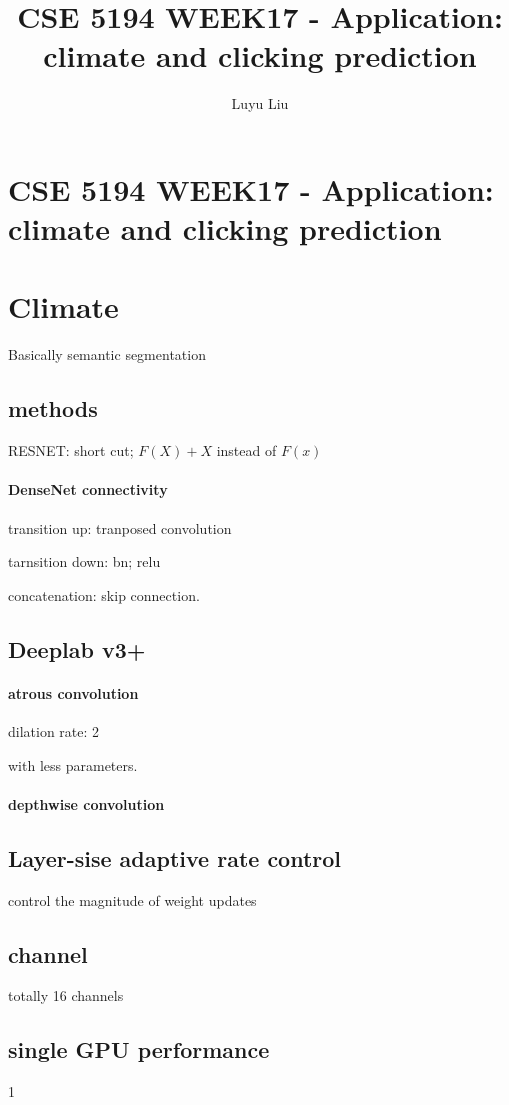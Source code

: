 \documentclass[12pt]{article}
\begin{document}
\author{Luyu Liu}

\newcommand\para{\par\refstepcounter{para}\thepara\space}

\section*{CSE 5194 WEEK17 - Application: climate and clicking prediction}
\title{CSE 5194 WEEK17 - Application: climate and clicking prediction}

\section{Climate}
Basically semantic segmentation
\subsection{methods}
RESNET: short cut; $F(X)+X$ instead of $F(x)$

\paragraph{DenseNet connectivity}

transition up: tranposed convolution 

tarnsition down: bn; relu

concatenation: skip connection.

\subsection{Deeplab v3+}
\paragraph{atrous convolution}
dilation rate: 2

with less parameters.

\paragraph{depthwise convolution}

\subsection{Layer-sise adaptive rate control}
control the magnitude of weight updates

\subsection{channel}
totally 16 channels

\subsection{single GPU performance}
1
\end{document}
